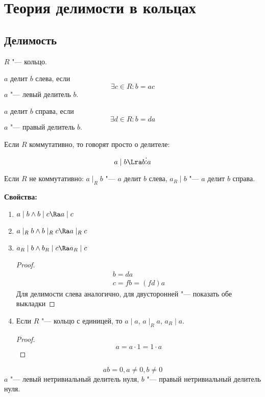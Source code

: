 \chapter{Теория делимости в кольцах}

\section{Делимость}

$R$ "--- кольцо.

\begin{Def}
	$a$ делит $b$ слева, если 
	\[  \exists c \in R \colon b = ac \]
	$a$ "--- левый делитель $b$.
\end{Def}

\begin{Def}
	$a$ делит $b$ справа, если 
	\[ \exists d \in R \colon b = da \]
	$a$ "--- правый делитель $b$.
\end{Def}

Если $R$ коммутативно, то говорят просто о делителе:
\[ a \mid b \Lra  b \vdots a \]

Если $R$ не коммутативно:
$a \mid_R b$ "--- $a$ делит $b$ слева, $a {}_R\mid b$ "--- $a$ делит $b$ справа.

\textbf{Свойства:}
\begin{enumerate}
	\item $a \mid b \land b \mid c \Ra a \mid c$
	\item $a \mid_R b \land b \mid_R c \Ra a \mid_R c$
	\item $a_R \mid b \land  b_R \mid c \Ra a_R \mid c$
	\begin{proof}
		\begin{gather*}
			 b = da \\
			 c = fb = (fd)a
		\end{gather*}
		Для делимости слева аналогично, для двусторонней "--- показать обе выкладки
	\end{proof}
	\item Если $R$ "--- кольцо с единицей, то $a \mid a$, $a \mid_R a$, $a_R \mid a$.
	\begin{proof}
		\[ a = a \cdot 1 = 1 \cdot a \]
	\end{proof}
\end{enumerate}

\begin{Def}
	\[ ab = 0, a \ne 0 ,b \ne 0 \]
	$a$ "--- левый нетривиальный делитель нуля, $b$ "--- правый нетривиальный делитель нуля.
\end{Def}

